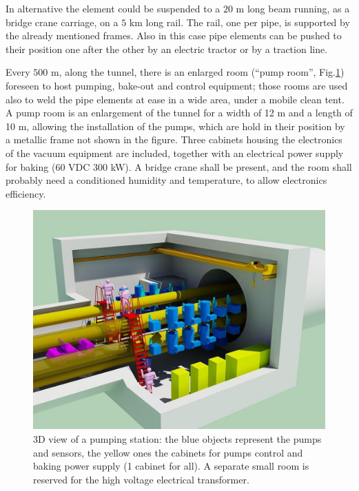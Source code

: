 In alternative the element could be suspended to a $20$ m long beam running, as a bridge crane carriage, on a $5$ km long rail. The rail, one per pipe, is supported by the already mentioned frames. Also in this case pipe elements can be pushed to their position one after the other by an electric tractor or by a traction line.

Every $500$ m, along the tunnel, there is an enlarged room (``pump room'', Fig.\ref{fig:VAC7}) foreseen to host pumping, bake-out and control equipment; those rooms are used also to weld the pipe elements at ease in a wide area, under a mobile clean tent. A pump room is an enlargement of the tunnel for a width of 12 m and a length of 10 m, allowing the installation of the pumps, which are hold in their position by a metallic frame not shown in the figure. Three cabinets housing the electronics of the vacuum equipment are included, together with an electrical power supply for baking (60 VDC 300 kW). A bridge crane shall be present, and the room shall probably need a conditioned humidity and temperature, to allow electronics efficiency.

\begin{figure}
\begin{center}
\includegraphics[width=\textwidth]{Sec_SiteInfra/Figures/VAC7.jpg}
\caption{3D view of a pumping station: the blue objects represent the pumps and sensors, the yellow ones the cabinets for pumps control and baking power supply (1 cabinet for all). A separate small room is reserved for the high voltage electrical transformer.}
\label{fig:VAC7}
\end{center}
\end{figure}


